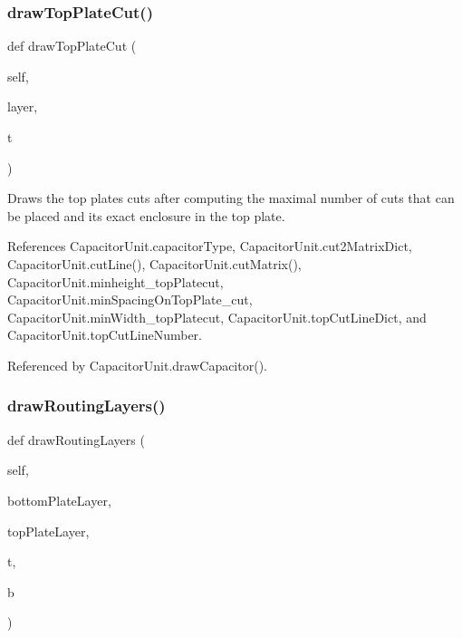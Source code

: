 \mbox{\label{classpython_1_1capacitorunit_1_1CapacitorUnit_aa4e6c1a2c4d502778db3d7f571cd8306}} 
\subsubsection{\texorpdfstring{draw\+Top\+Plate\+Cut()}{drawTopPlateCut()}}
{\footnotesize\ttfamily def draw\+Top\+Plate\+Cut (\begin{DoxyParamCaption}\item[{}]{self,  }\item[{}]{layer,  }\item[{}]{t }\end{DoxyParamCaption})}



Draws the top plate\textquotesingle{}s cuts after computing the maximal number of cuts that can be placed and its exact enclosure in the top plate. 



References Capacitor\+Unit.\+capacitor\+Type, Capacitor\+Unit.\+cut2\+Matrix\+Dict, Capacitor\+Unit.\+cut\+Line(), Capacitor\+Unit.\+cut\+Matrix(), Capacitor\+Unit.\+minheight\+\_\+top\+Platecut, Capacitor\+Unit.\+min\+Spacing\+On\+Top\+Plate\+\_\+cut, Capacitor\+Unit.\+min\+Width\+\_\+top\+Platecut, Capacitor\+Unit.\+top\+Cut\+Line\+Dict, and Capacitor\+Unit.\+top\+Cut\+Line\+Number.



Referenced by Capacitor\+Unit.\+draw\+Capacitor().

\mbox{\label{classpython_1_1capacitorunit_1_1CapacitorUnit_a786938220c3b8fbe346cc53012385c4e}} 
\subsubsection{\texorpdfstring{draw\+Routing\+Layers()}{drawRoutingLayers()}}
{\footnotesize\ttfamily def draw\+Routing\+Layers (\begin{DoxyParamCaption}\item[{}]{self,  }\item[{}]{bottom\+Plate\+Layer,  }\item[{}]{top\+Plate\+Layer,  }\item[{}]{t,  }\item[{}]{b }\end{DoxyParamCaption})}



